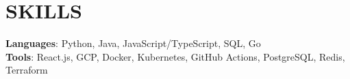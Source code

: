 \section{SKILLS}
\begin{itemize}[leftmargin=0in, label={}]
  \small{\item{
    \textbf{Languages}: Python, Java, JavaScript/TypeScript, SQL, Go\\
    \textbf{Tools}: React.js, GCP, Docker, Kubernetes, GitHub Actions, PostgreSQL, Redis, Terraform
  }}
\end{itemize}
